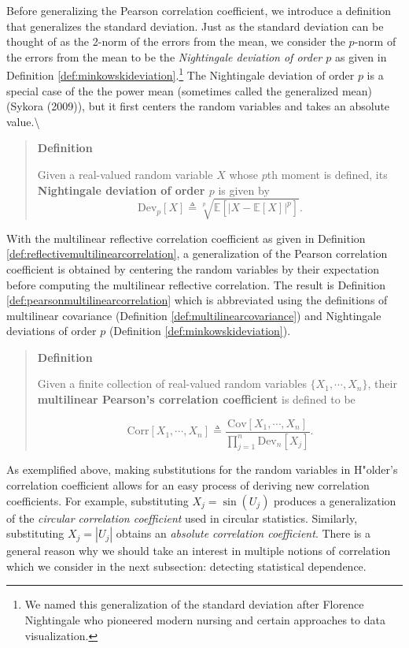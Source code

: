 \documentclass[
  letterpaper,
  DIV=11,
  numbers=noendperiod]{scrreprt}
\begin{document}
Before generalizing the Pearson correlation coefficient, we introduce a
definition that generalizes the standard deviation. Just as the standard
deviation can be thought of as the 2-norm of the errors from the mean,
we consider the \(p\)-norm of the errors from the mean to be the
\textit{Nightingale deviation of order $p$} as given in Definition
\ref{def:minkowskideviation}.\footnote{We named this generalization of the standard deviation after Florence Nightingale who pioneered modern nursing and certain approaches to data visualization.}
The Nightingale deviation of order \(p\) is a special case of the the
power mean (sometimes called the generalized mean) (Sykora (2009)), but
it first centers the random variables and takes an absolute
value.\textbackslash{}

\begin{quote}
\textbf{Definition}

Given a real-valued random variable \(X\) whose \(p\)th moment is
defined, its \textbf{Nightingale deviation of order \(p\)} is given by
\[\text{Dev}_p[X] \triangleq \sqrt[p]{\mathbb{E}\left[\left|X - \mathbb{E}\left[ X \right]\right|^p\right]}.\]
\end{quote}

With the multilinear reflective correlation coefficient as given in
Definition \ref{def:reflectivemultilinearcorrelation}, a generalization
of the Pearson correlation coefficient is obtained by centering the
random variables by their expectation before computing the multilinear
reflective correlation. The result is Definition
\ref{def:pearsonmultilinearcorrelation} which is abbreviated using the
definitions of multilinear covariance (Definition
\ref{def:multilinearcovariance}) and Nightingale deviations of order
\(p\) (Definition \ref{def:minkowskideviation}).

\begin{quote}
\textbf{Definition}

Given a finite collection of real-valued random variables
\(\{X_1, \cdots, X_n\}\), their \textbf{multilinear Pearson's
correlation coefficient} is defined to be

\[\text{Corr}\left[ X_1, \cdots, X_n \right] \triangleq \frac{\text{Cov} \left[ X_1, \cdots, X_n \right]}{\prod_{j=1}^{n} \text{Dev}_n[X_j]}.\]
\end{quote}

As exemplified above, making substitutions for the random variables in
H"older's correlation coefficient allows for an easy process of deriving
new correlation coefficients. For example, substituting
\(X_j = \sin (U_j)\) produces a generalization of the
\textit{circular correlation coefficient} used in circular statistics.
Similarly, substituting \(X_j = |U_j|\) obtains an
\textit{absolute correlation coefficient}. There is a general reason why
we should take an interest in multiple notions of correlation which we
consider in the next subsection: detecting statistical dependence.
\end{document}

